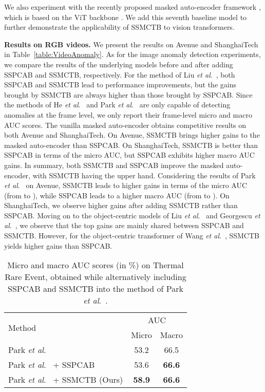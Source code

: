 \documentclass[10pt,journal,compsoc]{IEEEtran}
\newcommand{\etal}{\textit{et al}.}
\begin{document}
We also experiment with the recently proposed masked auto-encoder framework \cite{He-CVPR-2022}, which is based on the ViT backbone \cite{Dosovitskiy-ICLR-2020}. We add this seventh baseline model to further demonstrate the applicability of SSMCTB to vision transformers.

\noindent
\textbf{Results on RGB videos.}
We present the results on Avenue and ShanghaiTech in Table~\ref{table:VideoAnomaly}. As for the image anomaly detection experiments, we compare the results of the underlying models before and after adding SSPCAB \cite{Ristea-CVPR-2022} and SSMCTB, respectively. For the method of Liu \etal~\cite{Liu-CVPR-2018}, both SSPCAB and SSMCTB lead to performance improvements, but the gains brought by SSMCTB are always higher than those brought by SSPCAB. Since the methods of He \etal~\cite{He-CVPR-2022} and Park \etal~\cite{Park-CVPR-2020} are only capable of detecting anomalies at the frame level, we only report their frame-level micro and macro AUC scores. The vanilla masked auto-encoder obtains competitive results on both Avenue and ShanghaiTech. On Avenue, SSMCTB brings higher gains to the masked auto-encoder than SSPCAB. On ShanghaiTech, SSMCTB is better than SSPCAB in terms of the micro AUC, but SSPCAB exhibits higher macro AUC gains. In summary, both SSMCTB and SSPCAB improve the masked auto-encoder, with SSMCTB having the upper hand. Considering the results of Park \etal~\cite{Park-CVPR-2020} on Avenue, SSMCTB leads to higher gains in terms of the micro AUC (from  to ), while SSPCAB leads to a higher macro AUC (from  to ). On ShanghaiTech, we observe higher gains after adding SSMCTB rather than SSPCAB. Moving on to the object-centric models of Liu \etal~\cite{Liu-ICCV-2021} and Georgescu \etal~\cite{Georgescu-TPAMI-2021}, we observe that the top gains are mainly shared between SSPCAB and SSMCTB. However, for the object-centric transformer of Wang \etal~\cite{Wang-ICDM-2022}, SSMCTB yields higher gains than SSPCAB.

\begin{table}[t]
\centering 
\caption{Micro and macro AUC scores (in \%) on Thermal Rare Event, obtained while alternatively including SSPCAB \cite{Ristea-CVPR-2022} and SSMCTB into the method of Park \etal~\cite{Park-CVPR-2020}.}
\vspace{-0.2cm}
\setlength\tabcolsep{5.0pt}
\small
\begin{tabular}{| l | c | c |} 
\hline
\multirow{2}{*}{Method} & \multicolumn{2}{c|}{AUC} \\
\cline{2-3}
  &  Micro & Macro \\
\hline \hline
Park \etal~\cite{Park-CVPR-2020} &  53.2 & 66.5  \\
Park \etal~\cite{Park-CVPR-2020} + SSPCAB & 53.6  & \textbf{66.6}  \\
Park \etal~\cite{Park-CVPR-2020} + SSMCTB (Ours) & \textbf{58.9}  & \textbf{66.6} \\
\hline
\end{tabular}
\vspace{-0.2cm}
\label{table:ResultsThermalData} \end{table}
\end{document}
